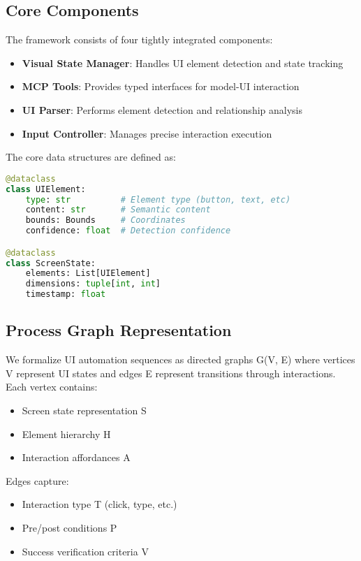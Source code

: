 \documentclass{article}
\begin{document}
\subsection{Core Components}
The framework consists of four tightly integrated components:

\begin{itemize}
    \item \textbf{Visual State Manager}: Handles UI element detection and state tracking
    \item \textbf{MCP Tools}: Provides typed interfaces for model-UI interaction
    \item \textbf{UI Parser}: Performs element detection and relationship analysis
    \item \textbf{Input Controller}: Manages precise interaction execution
\end{itemize}

The core data structures are defined as:

\begin{lstlisting}[language=Python]
@dataclass
class UIElement:
    type: str          # Element type (button, text, etc)
    content: str       # Semantic content
    bounds: Bounds     # Coordinates  
    confidence: float  # Detection confidence

@dataclass
class ScreenState:
    elements: List[UIElement]
    dimensions: tuple[int, int]
    timestamp: float
\end{lstlisting}

\subsection{Process Graph Representation}
We formalize UI automation sequences as directed graphs G(V, E) where vertices V represent UI states and edges E represent transitions through interactions. Each vertex contains:

\begin{itemize}
    \item Screen state representation S
    \item Element hierarchy H
    \item Interaction affordances A
\end{itemize}

Edges capture:
\begin{itemize}
    \item Interaction type T (click, type, etc.)
    \item Pre/post conditions P
    \item Success verification criteria V
\end{itemize}
\end{document}
